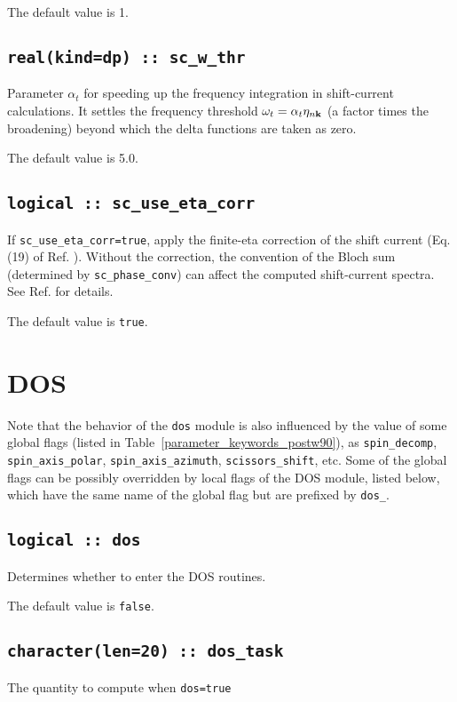The default value is 1. 


\subsection{\tt real(kind=dp)  :: sc\_w\_thr}

Parameter $\alpha_{t}$ for speeding up the frequency integration in shift-current calculations.
It settles the frequency threshold $\omega_{t}=\alpha_{t}\eta_{n{\bf k}}$
(a factor times the broadening)
beyond which the delta functions are taken as zero. 


The default value is 5.0. 


\subsection{\tt logical :: sc\_use\_eta\_corr}

If {\tt sc\_use\_eta\_corr=true}, apply the finite-eta correction of the shift current (Eq. (19) of Ref. \cite{Lihm_shift_eta_2021}). Without the correction, the convention of the Bloch sum (determined by {\tt sc\_phase\_conv}) can affect the computed shift-current spectra. See Ref. \cite{Lihm_shift_eta_2021} for details.

The default value is {\tt true}.


\clearpage
\section{DOS}
Note that the behavior of the \verb#dos# module  is also influenced by
the value of some global flags (listed in
Table~\ref{parameter_keywords_postw90}), as
\verb#spin_decomp#, \verb#spin_axis_polar#, \verb#spin_axis_azimuth#,
\verb#scissors_shift#, etc.
Some of the global flags can be possibly
overridden by local flags of the DOS module, listed below, which have
the same name of the global flag but are prefixed by \verb#dos_#.

\subsection[dos]{\tt logical :: dos}
Determines whether to enter the DOS routines.

The default value is \verb#false#.


\subsection[dos\_task]{\tt character(len=20) ::  dos\_task}
The quantity to compute when {\tt dos=true}

